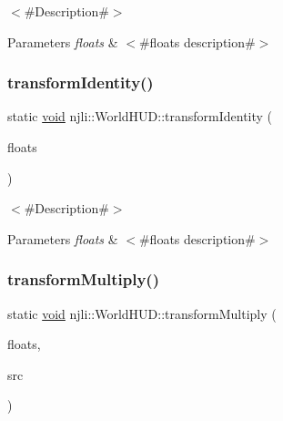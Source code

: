 $<$\#\+Description\#$>$


\begin{DoxyParams}{Parameters}
{\em floats} & $<$\#floats description\#$>$ \\
\hline
\end{DoxyParams}
\mbox{\label{classnjli_1_1_world_h_u_d_a955b40e9d22eec4542d89d1f4d9b054b}} 
\subsubsection{\texorpdfstring{transform\+Identity()}{transformIdentity()}\hspace{0.1cm}{\footnotesize\ttfamily [2/2]}}
{\footnotesize\ttfamily static \mbox{\hyperlink{_thread_8h_af1e856da2e658414cb2456cb6f7ebc66}{void}} njli\+::\+World\+H\+U\+D\+::transform\+Identity (\begin{DoxyParamCaption}\item[{\mbox{\hyperlink{_util_8h_a5f6906312a689f27d70e9d086649d3fd}{f32}} $\ast$}]{floats }\end{DoxyParamCaption})\hspace{0.3cm}{\ttfamily [static]}}

$<$\#\+Description\#$>$


\begin{DoxyParams}{Parameters}
{\em floats} & $<$\#floats description\#$>$ \\
\hline
\end{DoxyParams}
\mbox{\label{classnjli_1_1_world_h_u_d_a5420b08725cf40282afa2d1b68d02c3d}} 
\subsubsection{\texorpdfstring{transform\+Multiply()}{transformMultiply()}\hspace{0.1cm}{\footnotesize\ttfamily [1/2]}}
{\footnotesize\ttfamily static \mbox{\hyperlink{_thread_8h_af1e856da2e658414cb2456cb6f7ebc66}{void}} njli\+::\+World\+H\+U\+D\+::transform\+Multiply (\begin{DoxyParamCaption}\item[{bt\+Matrix3x3 \&}]{floats,  }\item[{const bt\+Matrix3x3 \&}]{src }\end{DoxyParamCaption})\hspace{0.3cm}{\ttfamily [static]}}

